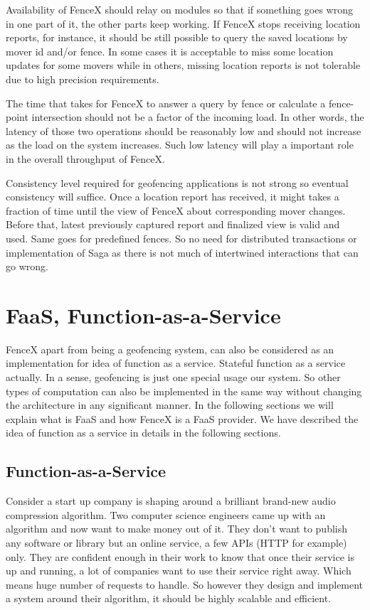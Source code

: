 \documentclass[a4]{report}
\begin{document}
    Availability of FenceX should relay on modules so that if something goes wrong in one part of it, the other parts
    keep working.
    If FenceX stops receiving location reports, for instance, it should be still possible to query the saved
    locations by mover id and/or fence.
    In some cases it is acceptable to miss some location updates for some movers while in others, missing location
    reports is not tolerable due to high precision requirements.

    The time that takes for FenceX to answer a query by fence or calculate a fence-point intersection should not be a
    factor of the incoming load.
    In other words, the latency of those two operations should be reasonably low and should not increase as the load
    on the system increases.
    Such low latency will play a important role in the overall throughput of FenceX.

    Consistency level required for geofencing applications is not strong so eventual consistency will suffice.
    Once a location report has received, it might takes a fraction of time until the view of FenceX about
    corresponding mover changes.
    Before that, latest previously captured report and finalized view is valid and used.
    Same goes for predefined fences.
    So no need for distributed transactions or implementation of Saga as there is not much of intertwined
    interactions that can go wrong.


    \chapter{FaaS, Function-as-a-Service}
    FenceX apart from being a geofencing system, can also be considered as an implementation for idea of function as
    a service\cite{whatisfaas}.
    Stateful function as a service actually.
    In a sense, geofencing is just one special usage our system.
    So other types of computation can also be implemented in the same way without changing the architecture in any
    significant manner.
    In the following sections we will explain what is FaaS and how FenceX is a FaaS provider.
    We have described the idea of function as a service in details in the following sections.


    \section{Function-as-a-Service}
    Consider a start up company is shaping around a brilliant brand-new audio compression algorithm.
    Two computer science engineers came up with an algorithm and now want to make money out of it.
    They don't want to publish any software or library but an online service, a few APIs (HTTP for example) only.
    They are confident enough in their work to know that once their service is up and running, a lot of companies
    want to use their service right away.
    Which means huge number of requests to handle.
    So however they design and implement a system around their algorithm, it should be highly scalable and efficient.
\end{document}
